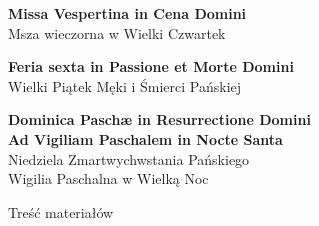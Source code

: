 \documentclass[11pt,oneside,notitlepage,a4paper,wide]{mwart}
\begin{document}

	{\centering\LARGE{\textbf{Missa Vespertina in Cena Domini}}\\\smallskip\large{Msza wieczorna w Wielki Czwartek}\par\vspace{5mm}}
	
	{\centering\LARGE{\textbf{Feria sexta in Passione et Morte Domini}}\\\smallskip\large{Wielki Piątek Męki i Śmierci Pańskiej}\par\vspace{5mm}}
	
	{\centering\LARGE{\textbf{Dominica Paschæ in Resurrectione Domini\\Ad Vigiliam Paschalem in Nocte Santa}}\\\smallskip\large{Niedziela Zmartwychwstania Pańskiego\\Wigilia Paschalna w Wielką Noc}\par\vspace{5mm}}

Treść materiałów
\end{document}
